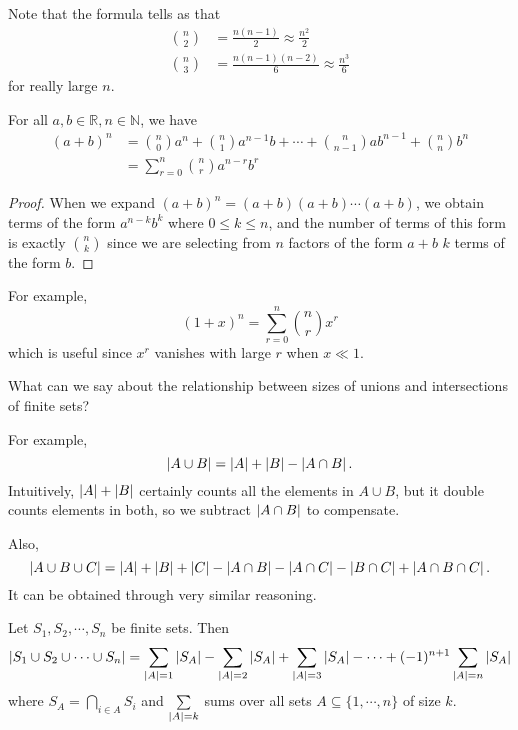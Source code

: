\documentclass[12pt]{article}
\begin{document}
Note that the formula tells as that
\begin{align*}
    \binom n 2 &= \frac{n(n-1)}{2} \approx \frac{n^{2}}{2}\\
    \binom n 3 &= \frac{n(n-1)(n-2)}{6} \approx \frac{n^{3}}{6}
\end{align*}
for really large $n$.

\begin{theorem}
    For all $a,b \in \mathbb{R}, n \in \mathbb{N}$,
    we have
    \begin{align*}
        (a+b)^{n} &= \binom n 0 a^{n} + \binom n 1 a^{n-1}b + \cdots 
               + \binom n{n-1}ab^{n-1} + \binom nn b^{n}\\
               &= \sum_{r=0}^{n}\binom nr a^{n-r}b^{r}
    \end{align*}
\end{theorem}
\begin{proof}
    When we expand $(a+b)^{n} = (a+b)(a+b)\cdots(a+b)$,
    we obtain terms of the form $a^{n-k}b^{k}$ where $0 \le k \le n$,
    and the number of terms of this form is exactly $\binom nk$
    since we are selecting from $n$ factors of the form $a+b$
    $k$ terms of the form $b$.
\end{proof}

For example,
\[
    (1+x)^{n} = \sum_{r=0}^{n}\binom nr x^{r}
\]
which is useful since $x^{r}$ vanishes with large $r$
when $x \ll 1$.

What can we say about the relationship
between sizes of unions and intersections
of finite sets?

For example,
\[
    \left\lvert A \cup B \right\rvert = \left\lvert A \right\rvert + \left\lvert B \right\rvert - \left\lvert A \cap B \right\rvert.
\]
Intuitively, $\left\lvert A \right\rvert + \left\lvert B \right\rvert$ certainly counts
all the elements in $A \cup B$, but it double counts
elements in both, so we subtract $\left\lvert A \cap B \right\rvert$ to compensate.

Also,
\[
\left\lvert A \cup B \cup C \right\rvert = \left\lvert A \right\rvert + \left\lvert B \right\rvert + \left\lvert C \right\rvert
- \left\lvert A \cap B \right\rvert - \left\lvert A \cap C \right\rvert - \left\lvert B \cap C \right\rvert + \left\lvert A \cap B \cap C \right\rvert.
\]
It can be obtained through very similar reasoning.

\begin{theorem}
    Let $S_{1},S_{2},\cdots,S_n$ be finite sets. Then
    \[
        \left\lvert S_{1}\cup S_{2}\cup \cdots \cup S_n \right\rvert =
        \sum_{\left\lvert A \right\rvert=1}\left\lvert S_A \right\rvert - \sum_{\left\lvert A \right\rvert=2}\left\lvert S_A \right\rvert
        +\sum_{\left\lvert A \right\rvert=3}\left\lvert S_A \right\rvert - \cdots + (-1)^{n+1}\sum_{\left\lvert A \right\rvert=n}\left\lvert S_A \right\rvert
    \]
    where $S_A = \bigcap_{i \in A} S_i$ and $\sum\limits_{\left\lvert A \right\rvert=k}$
    sums over all sets $A \subseteq \{1,\cdots,n\}$ of size $k$.
\end{theorem}
\end{document}
